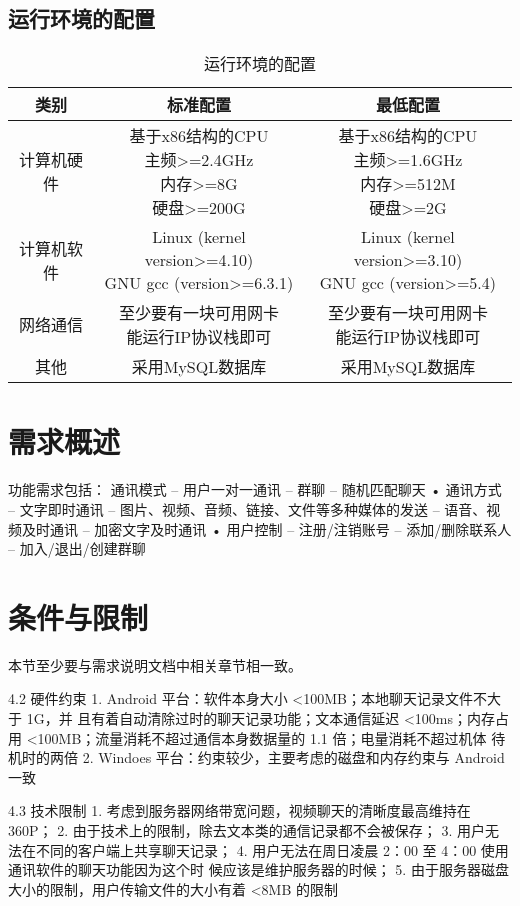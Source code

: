 \subsection{运行环境的配置}
\begin{table}[htbp]
\centering
\caption{运行环境的配置} \label{tab:operation-environment}
\begin{tabular}{|c|c|c|}
    \hline
    类别 & 标准配置 & 最低配置 \\
    \hline
    计算机硬件 & \tabincell{c}{基于x86结构的CPU\\ 主频>=2.4GHz\\ 内存>=8G\\ 硬盘>=200G} & \tabincell{c}{基于x86结构的CPU\\ 主频>=1.6GHz\\ 内存>=512M\\ 硬盘>=2G} \\
    \hline
    计算机软件 & \tabincell{c}{Linux (kernel version>=4.10)\\ GNU gcc (version>=6.3.1)} & \tabincell{c}{Linux (kernel version>=3.10)\\ GNU gcc (version>=5.4)} \\
    \hline
    网络通信 & \tabincell{c}{至少要有一块可用网卡\\ 能运行IP协议栈即可} & \tabincell{c}{至少要有一块可用网卡\\ 能运行IP协议栈即可} \\
    \hline
    其他 & 采用MySQL数据库 & 采用MySQL数据库 \\
    \hline

\end{tabular}
\end{table}

\section{需求概述}
功能需求包括：
通讯模式
– 用户一对一通讯
– 群聊
– 随机匹配聊天
• 通讯方式
– 文字即时通讯
– 图片、视频、音频、链接、文件等多种媒体的发送
– 语音、视频及时通讯
– 加密文字及时通讯
• 用户控制
– 注册/注销账号
– 添加/删除联系人
– 加入/退出/创建群聊

\section{条件与限制}
本节至少要与需求说明文档中相关章节相一致。

4.2 硬件约束
1. Android 平台：软件本身大小 <100MB；本地聊天记录文件不大于 1G，并
且有着自动清除过时的聊天记录功能；文本通信延迟 <100ms；内存占用
<100MB；流量消耗不超过通信本身数据量的 1.1 倍；电量消耗不超过机体
待机时的两倍
2. Windoes 平台：约束较少，主要考虑的磁盘和内存约束与 Android 一致

4.3 技术限制
1. 考虑到服务器网络带宽问题，视频聊天的清晰度最高维持在 360P；
2. 由于技术上的限制，除去文本类的通信记录都不会被保存；
3. 用户无法在不同的客户端上共享聊天记录；
4. 用户无法在周日凌晨 2：00 至 4：00 使用通讯软件的聊天功能因为这个时
候应该是维护服务器的时候；
5. 由于服务器磁盘大小的限制，用户传输文件的大小有着 <8MB 的限制
